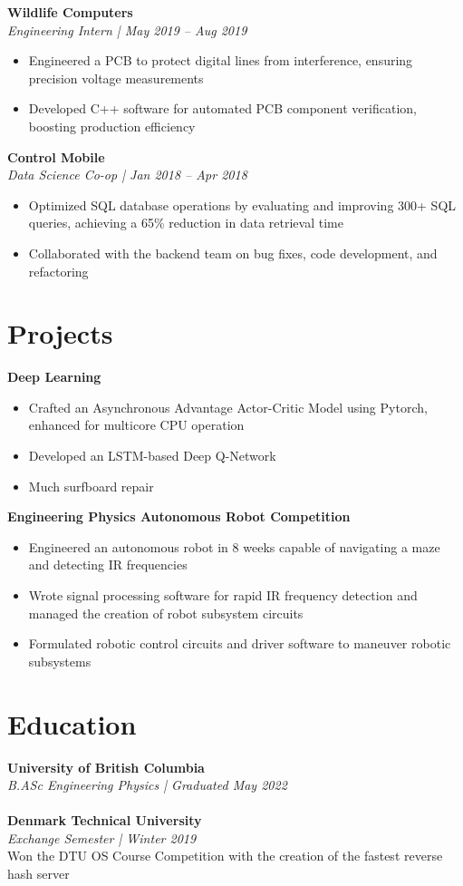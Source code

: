 \documentclass[letterpaper,10pt]{article}
\begin{document}
\noindent
{\bf Wildlife Computers} \\
\textit{Engineering Intern | May 2019 – Aug 2019}
\begin{itemize}
    \item Engineered a PCB to protect digital lines from interference, ensuring precision voltage measurements
    \item Developed C++ software for automated PCB component verification, boosting production efficiency
\end{itemize}

\noindent
{\bf Control Mobile} \\
\textit{Data Science Co-op | Jan 2018 – Apr 2018}
\begin{itemize}
    \item Optimized SQL database operations by evaluating and improving 300+ SQL queries, achieving a 65\% reduction in data retrieval time
    \item Collaborated with the backend team on bug fixes, code development, and refactoring
\end{itemize}

\section*{Projects}

\noindent
{\bf Deep Learning}
\begin{itemize}
    \item Crafted an Asynchronous Advantage Actor-Critic Model using Pytorch, enhanced for multicore CPU operation
    \item Developed an LSTM-based Deep Q-Network
    \item Much surfboard repair
\end{itemize}

\noindent
{\bf Engineering Physics Autonomous Robot Competition}
\begin{itemize}
    \item Engineered an autonomous robot in 8 weeks capable of navigating a maze and detecting IR frequencies
    \item Wrote signal processing software for rapid IR frequency detection and managed the creation of robot subsystem circuits
    \item Formulated robotic control circuits and driver software to maneuver robotic subsystems
\end{itemize}

\section*{Education}

\noindent
{\bf University of British Columbia} \\
\textit{B.ASc Engineering Physics | Graduated May 2022} \\
\ \\
{\bf Denmark Technical University} \\
\textit{Exchange Semester | Winter 2019} \\
Won the DTU OS Course Competition with the creation of the fastest reverse hash server
\end{document}
